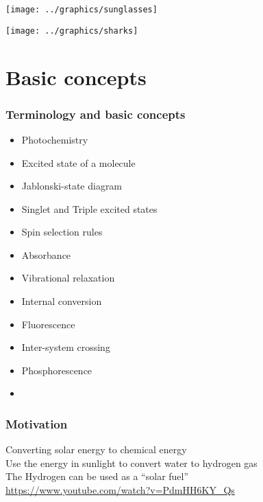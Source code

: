 \documentclass[a4paper,12pt,titlepage]{article}
\begin{document}
\begin{frame}
  \begin{center}
     \texttt{[image: ../graphics/sunglasses]}
  \end{center}
\end{frame}

\begin{frame}
  \begin{center}
     \texttt{[image: ../graphics/sharks]}
  \end{center}
\end{frame}
	
\section{Basic concepts}

\begin{frame}[<+->]
\frametitle{Terminology and basic concepts}
  \begin{itemize}
  \item Photochemistry
  \item Excited state of a molecule
  \item Jablonski-state diagram
  \item Singlet and Triple excited states
  \item Spin selection rules
  \item Absorbance
  \item Vibrational relaxation
  \item Internal conversion
  \item Fluorescence
  \item Inter-system crossing
  \item Phosphorescence
  \item[] 
  \end{itemize}
\end{frame}

\begin{frame}
\frametitle{Motivation}
\textbullet Converting solar energy to chemical energy\medskip\\
\textbullet Use the energy in sunlight to convert water to hydrogen gas\medskip\\
\textbullet The Hydrogen can be used as a ``solar fuel''\medskip\\

\url{https://www.youtube.com/watch?v=PdmHH6KY_Qs}
\end{frame}
\end{document}
